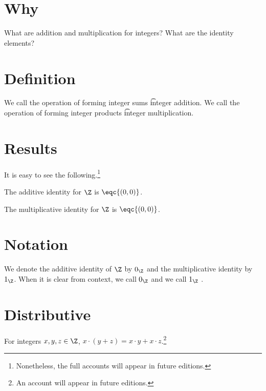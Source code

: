 

\section*{Why}

What are addition and multiplication for integers?
What are the identity elements?

\section*{Definition}

We call the operation of forming integer sums \t{integer addition}.
We call the operation of forming integer products \t{integer multiplication}.

\section*{Results}

It is easy to see the following.\footnote{Nonetheless, the full accounts will appear in future editions.}

\begin{proposition}
The additive identity for $\Z $ is $\eqc{(0, 0)}$.\end{proposition}
\begin{proposition}
The multiplicative identity for $\Z $ is $\eqc{(0, 0)}$.\end{proposition}
\section*{Notation}

We denote the additive identity of $\Z $ by $0_{\Z }$ and the multiplicative identity by $1_{\Z }$.
When it is clear from context, we call $0_{\Z }$  and we call $1_{\Z }$ .

\section*{Distributive}

\begin{proposition}
For integers $x, y, z \in \Z $, $x \cdot  (y + z) = x\cdot y + x\cdot  z$.\footnote{An account will appear in future editions.}\end{proposition}
\blankpage